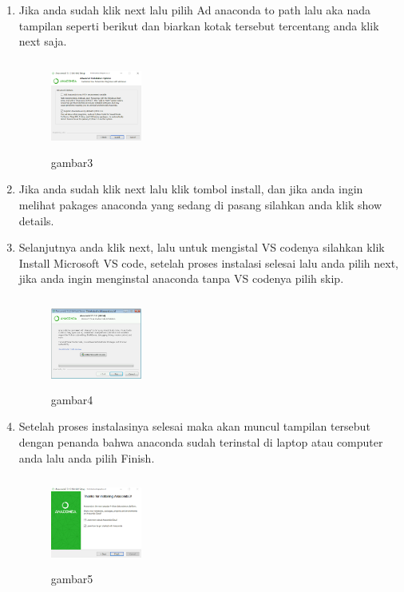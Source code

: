 \begin{enumerate}
    \item Jika anda sudah klik next lalu pilih Ad anaconda to path lalu aka nada tampilan seperti berikut dan biarkan kotak tersebut tercentang anda klik next saja.
    \begin{figure}[!htbp]
        \centering
        \includegraphics[width=3cm,height=3cm]{figures/choi/3.png}
        \caption{gambar3}
        \label{gambar ketiga}
        \end{figure}
    \item Jika anda sudah klik next lalu klik tombol install, dan jika anda ingin melihat pakages anaconda yang sedang di pasang silahkan anda klik show details.
    \item Selanjutnya anda klik next, lalu untuk mengistal VS codenya silahkan klik Install Microsoft VS code, setelah proses instalasi selesai lalu anda pilih next, jika anda ingin menginstal anaconda tanpa VS codenya pilih skip.
    \begin{figure}[!htbp]
        \centering
        \includegraphics[width=3cm,height=3cm]{figures/choi/4.png}
        \caption{gambar4}
        \label{gambar ke empat}
        \end{figure}

    \item Setelah proses instalasinya selesai maka akan muncul tampilan tersebut dengan penanda bahwa anaconda sudah terinstal di laptop atau computer anda lalu anda pilih Finish.
    \begin{figure}[!htbp]
        \centering
        \includegraphics[width=3cm,height=3cm]{figures/choi/5.png}
        \caption{gambar5}
        \label{gambar kelima}
        \end{figure}
\end{enumerate}

